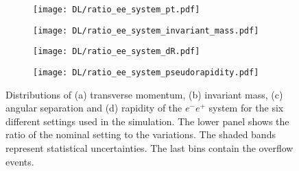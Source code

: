 \begin{figure}[H]
    \centering
    \begin{subfigure}{0.49\textwidth}
        \centering
        \texttt{[image: DL/ratio\_ee\_system\_pt.pdf]}
        \caption{}
        \label{app:subfig:pt(ee)_DL}
    \end{subfigure}
    \begin{subfigure}{0.49\textwidth}
        \centering
        \texttt{[image: DL/ratio\_ee\_system\_invariant\_mass.pdf]}
        \caption{}
        \label{app:subfig:m(ee)_DL}
    \end{subfigure}

    \vspace{0.2cm}
    
    \begin{subfigure}{0.49\textwidth}
        \centering
        \texttt{[image: DL/ratio\_ee\_system\_dR.pdf]}
        \caption{}
        \label{app:subfig:dR(ee)_DL}
    \end{subfigure}
    \begin{subfigure}{0.49\textwidth}
        \centering
        \texttt{[image: DL/ratio\_ee\_system\_pseudorapidity.pdf]}
        \caption{}
        \label{app:subfig:eta(ee)_DL}
    \end{subfigure}
    \caption{Distributions of (a) transverse momentum, (b) invariant mass,  (c) angular separation and (d) rapidity of the $e^-e^+$ system for the six different settings used in the simulation. The lower panel shows the ratio of the nominal setting to the variations. The shaded bands represent statistical uncertainties. The last bins contain the overflow events.}
    \label{app:fig:ee_DL}
\end{figure}


